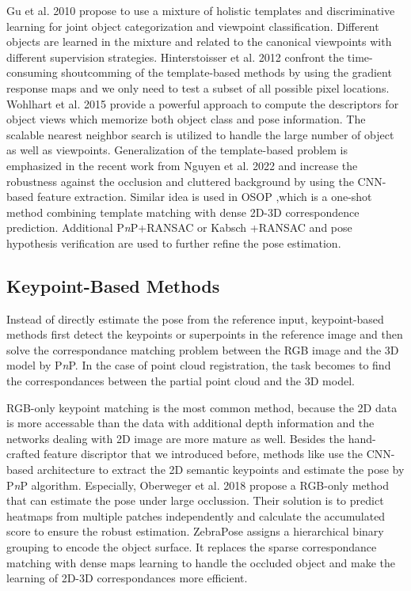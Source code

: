 \documentclass[12pt,DIV14,BCOR12mm,a4paper,footinclude=false,headinclude,parskip=half-,twoside,openright,cleardoublepage=empty,toc=index,bibliography=totoc,listof=totoc]{scrreprt}
\numberwithin{equation}{chapter}
\begin{document}
Gu et al. 2010 \cite{gu2010discriminative} propose to use a mixture of holistic templates and discriminative learning for joint object categorization and viewpoint classification. Different objects are learned in the mixture and related to the canonical viewpoints with different supervision strategies. Hinterstoisser et al. 2012 \cite{hinterstoisser2012gradient} confront the time-consuming shoutcomming of the template-based methods by using the gradient response maps and we only need to test a subset of all possible pixel locations. Wohlhart et al. 2015 \cite{Wohlhart_2015} provide a powerful approach to compute the descriptors for object views which memorize both object class and pose information. The scalable nearest neighbor search is utilized to handle the large number of object as well as viewpoints. Generalization of the template-based problem is emphasized in the recent work from Nguyen et al. 2022 \cite{nguyen2022templates} and increase the robustness against the occlusion and cluttered background by using the CNN-based feature extraction. Similar idea is used in OSOP \cite{shugurov2022osop},which is a one-shot method combining template matching with dense 2D-3D correspondence prediction. Additional P\textit{n}P+RANSAC or Kabsch \cite{kabsch1976solution}+RANSAC and pose hypothesis verification are used to further refine the pose estimation.
\subsection{Keypoint-Based Methods} 
Instead of directly estimate the pose from the reference input, keypoint-based methods first detect the keypoints or superpoints in the reference image and then solve the correspondance matching problem between the RGB image and the 3D model by P\textit{n}P. In the case of point cloud registration, the task becomes to find the correspondances between the partial point cloud and the 3D model.

RGB-only keypoint matching is the most common method, because the 2D data is more accessable than the data with additional depth information and the networks dealing with 2D image are more mature as well. Besides the hand-crafted feature discriptor that we introduced before, methods like \cite{pavlakos20176dof, rad2018bb8, pmlr-v87-tremblay18a,tekin2018realtime} use the CNN-based architecture to extract the 2D semantic keypoints and estimate the pose by P\textit{n}P algorithm. Especially, Oberweger et al. 2018 \cite{oberweger2018making} propose a RGB-only method that can estimate the pose under large occlussion. Their solution is to predict heatmaps from multiple patches independently and calculate the accumulated score to ensure the robust estimation. ZebraPose \cite{su2022zebrapose} assigns a hierarchical binary grouping to encode the object surface. It replaces the sparse correspondance matching with dense maps learning to handle the occluded object and make the learning of 2D-3D correspondances more efficient.
\end{document}
